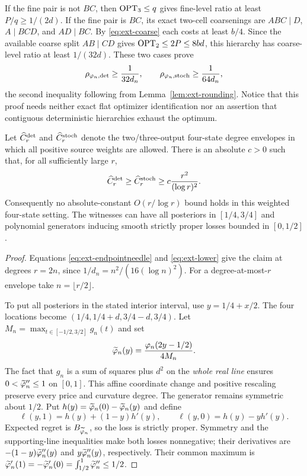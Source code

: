 If the fine pair is not $BC$, then $\operatorname{OPT}_3\le q$ gives fine-level ratio
at least $P/q\ge1/(2d)$. If the fine pair is $BC$, its exact two-cell
coarsenings are $ABC\mid D$, $A\mid BCD$, and $AD\mid BC$. By
\eqref{eq:ext-coarse} each costs at least $b/4$. Since the available
coarse split $AB\mid CD$ gives $\operatorname{OPT}_2\le2P\le8bd$, this hierarchy has
coarse-level ratio at least $1/(32d)$. These two cases prove
\begin{equation}
 \rho_{\varphi_n,\mathrm{det}}\ge\frac1{32d_n},\qquad
 \rho_{\varphi_n,\mathrm{stoch}}\ge\frac1{64d_n},
 \label{eq:ext-lower}
\end{equation}
the second inequality following from Lemma~\ref{lem:ext-rounding}.
Notice that this proof needs neither exact flat optimizer identification nor
an assertion that contiguous deterministic hierarchies exhaust the optimum.

\begin{theorem}
\label{thm:ext-weightdegenerate}
Let $\widehat C_r^{\mathrm{det}}$ and $\widehat C_r^{\mathrm{stoch}}$ denote the two/three-output
four-state degree envelopes in which all positive source weights are allowed.
There is an absolute $c>0$ such that, for all sufficiently large $r$,
\[
 \widehat C_r^{\mathrm{det}}\ge\widehat C_r^{\mathrm{stoch}}
 \ge c\frac{r^2}{(\log r)^2}.
\]
Consequently no absolute-constant $O(r/\log r)$ bound holds in this weighted
four-state setting. The witnesses can have all posteriors in $[1/4,3/4]$
and polynomial generators inducing smooth strictly proper losses bounded
in $[0,1/2]$.
\end{theorem}
\begin{proof}
Equations \eqref{eq:ext-endpointneedle} and \eqref{eq:ext-lower} give the
claim at degrees $r=2n$, since $1/d_n=n^2/(16(\log n)^2)$.
For a degree-at-most-$r$ envelope take $n=\lfloor r/2\rfloor$.

To put all posteriors in the stated interior interval, use
$y=1/4+x/2$. The four locations become
$(1/4,1/4+d,3/4-d,3/4)$.
Let $M_n=\max_{t\in[-1/2,3/2]}g_n(t)$ and set
\[
 \widetilde{\varphi}_n(y)=\frac{\varphi_n(2y-1/2)}{4M_n}.
\]
The fact that $g_n$ is a sum of squares plus $d^2$ on the \emph{whole real
line} ensures $0<\widetilde{\varphi}_n''\le1$ on $[0,1]$. This affine coordinate
change and positive rescaling preserve every price and curvature degree.
The generator remains symmetric about $1/2$. Put
$h(y)=\widetilde{\varphi}_n(0)-\widetilde{\varphi}_n(y)$ and define
\[
 \ell(y,1)=h(y)+(1-y)h'(y),\qquad
 \ell(y,0)=h(y)-yh'(y).
\]
Expected regret is $B_{\widetilde{\varphi}_n}$, so the loss is strictly proper.
Symmetry and the supporting-line inequalities make both losses nonnegative;
their derivatives are $-(1-y)\widetilde{\varphi}_n''(y)$ and
$y\widetilde{\varphi}_n''(y)$, respectively. Their common maximum is
$\widetilde{\varphi}_n'(1)=-\widetilde{\varphi}_n'(0)
=\int_{1/2}^1\widetilde{\varphi}_n''\le1/2$.
\end{proof}

